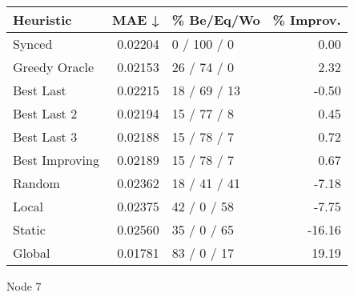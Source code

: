 \begin{tabular}{lrlr}
\toprule
\textbf{Heuristic} & \textbf{MAE ↓} & \textbf{\% Be/Eq/Wo} & \textbf{\% Improv.} \\
\midrule
            Synced &        0.02204 &          0 / 100 / 0 &                0.00 \\
     Greedy Oracle &        0.02153 &          26 / 74 / 0 &                2.32 \\
         Best Last &        0.02215 &         18 / 69 / 13 &               -0.50 \\
       Best Last 2 &        0.02194 &          15 / 77 / 8 &                0.45 \\
       Best Last 3 &        0.02188 &          15 / 78 / 7 &                0.72 \\
    Best Improving &        0.02189 &          15 / 78 / 7 &                0.67 \\
            Random &        0.02362 &         18 / 41 / 41 &               -7.18 \\
             Local &        0.02375 &          42 / 0 / 58 &               -7.75 \\
            Static &        0.02560 &          35 / 0 / 65 &              -16.16 \\
            Global &        0.01781 &          83 / 0 / 17 &               19.19 \\
\bottomrule
\end{tabular}
\caption{Node 7}
\label{tab:iid_lr05_le1_bs2_7}
